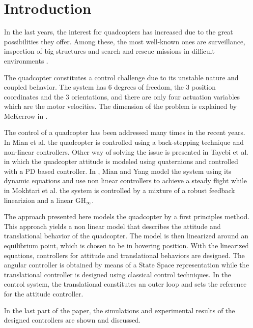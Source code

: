 \section{Introduction}
In the last years, the interest for quadcopters has increased due to the great possibilities they offer. Among these, the most well-known ones are surveillance, inspection of big structures and search and rescue missions in difficult environments \cite{droneuses}.

The quadcopter constitutes a control challenge due to its unstable nature and coupled behavior. The system has 6 degrees of freedom, the 3 position coordinates and the 3 orientations, and there are only four actuation variables which are the motor velocities. The dimension of the problem is explained by McKerrow in \cite{draganflyer}.

The control of a quadcopter has been addressed many times in the recent years. In Mian et al. \cite{backstepping} the quadcopter is controlled using a back-stepping technique and non-linear controllers. Other way of solving the issue is presented in Tayebi et al. \cite{quaternionsPD} in which the quadcopter attitude is modeled using quaternions and controlled with a PD based controller. In \cite{MianWang}, Mian and Yang model the system using its dynamic equations and use non linear controllers to achieve a steady flight while in Mokhtari et al. \cite{GHinf} the system is controlled by a mixture of a robust feedback linearizion and a linear GH$_{\infty}$.

The approach presented here models the quadcopter by a first principles method. This approach yields a non linear model that describes the attitude and translational behavior of the quadcopter. The model is then linearized around an equilibrium point, which is chosen to be in hovering position. With the linearized equations, controllers for attitude and translational behaviors are designed. The angular controller is obtained by means of a State Space representation while the translational controller is designed using classical control techniques. In the control system, the translational constitutes an outer loop and sets the reference for the attitude controller.

In the last part of the paper, the simulations and experimental results of the designed controllers are shown and discussed.